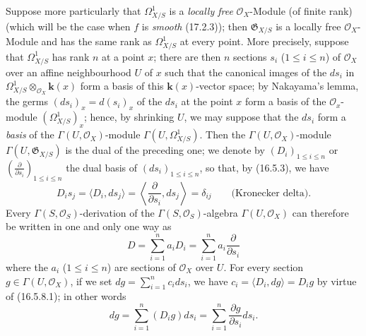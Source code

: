\begin{env}[16.5.8]
\label{IV.16.5.8}
Suppose more particularly that $\varOmega_{X/S}^1$ is a \emph{locally free}
$\mathcal{O}_X$-Module (of finite rank) (which will be the
case when $f$ is \emph{smooth} (17.2.3)); then $\mathfrak{G}_{X/S}$ is a locally
free $\mathcal{O}_X$-Module and has the same rank as $\varOmega_{X/S}^1$
at every point. More precisely, suppose that $\varOmega_{X/S}^1$ has
rank $n$ at a point $x$; there are then $n$ sections $s_i$ ($1\leq i\leq n$)
of $\mathcal{O}_X$ over an affine neighbourhood $U$ of $x$ such that the
canonical images of the $ds_i$ in
$\varOmega_{X/S}^1\otimes_{\mathcal{O}_X}\boldsymbol{k}(x)$ form a basis of this
$\boldsymbol{k}(x)$-vector space; by Nakayama's lemma, the germs
$(ds_i)_x=d(s_i)_x$ of the $ds_i$ at the point $x$ form a basis of the
$\mathcal{O}_x$-module $(\varOmega_{X/S}^1)_x$; hence, by shrinking $U$, we
may suppose that the $ds_i$ form a \emph{basis} of the
$\Gamma(U,\mathcal{O}_X)$-module $\Gamma(U,\varOmega_{X/S}^1)$. Then the
$\Gamma(U,\mathcal{O}_X)$-module $\Gamma(U,\mathfrak{G}_{X/S})$ is the dual of
the preceding one; we denote by $(D_i)_{1\leq i\leq n}$ or
$\left(\frac{\partial}{\partial s_i}\right)_{1\leq i\leq n}$ the dual basis of
$(ds_i)_{1\leq i\leq n}$, so that, by (16.5.3), we have
\[
  D_is_j=\langle D_i,ds_j\rangle
  =\left\langle\frac{\partial}{\partial s_i},ds_j\right\rangle
  =\delta_{ij}\qquad\text{(Kronecker delta).}
  \tag{16.5.8.1}
  \label{IV.16.5.8.1}
\]
Every $\Gamma(S,\mathcal{O}_S)$-derivation of the
$\Gamma(S,\mathcal{O}_S)$-algebra $\Gamma(U,\mathcal{O}_X)$ can therefore be
written in one and only one way as
\[
  D=\sum_{i=1}^n a_iD_i=\sum_{i=1}^n a_i\frac{\partial}{\partial s_i}
\]
where the $a_i$ ($1\leq i\leq n$) are sections of $\mathcal{O}_X$ over
$U$. For every section $g\in\Gamma(U,\mathcal{O}_X)$, if we set
$dg=\sum_{i=1}^n c_i ds_i$, we have
$c_i=\langle D_i,dg\rangle=D_ig$ by virtue of (16.5.8.1); in other words
\[
  dg=\sum_{i=1}^n(D_ig)ds_i
  =\sum_{i=1}^n\frac{\partial g}{\partial s_i}ds_i.
  \tag{16.5.8.2}
  \label{IV.16.5.8.2}
\]
\end{env}

